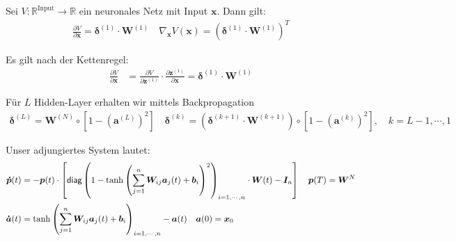 \documentclass[a4paper, 12pt]{scrartcl}
\begin{document}
\begin{satz}
    Sei $V:\mathbb{R}^{\text{Input}} \to \mathbb{R}$ ein neuronales Netz mit Input $\bm{x}$. 
    Dann gilt:
    \begin{align*}
        \frac{\partial V}{\partial \bm{x}} = \bm{\delta}^{(1)} \cdot \bm{W}^{(1)}
        \quad
        \nabla_{\bm{x}} V(\bm{x}) 
        =
        \left(\bm{\delta}^{(1)} \cdot \bm{W}^{(1)}\right)^T 
    \end{align*}
\end{satz}

\begin{beweis}
    Es gilt nach der Kettenregel:
    \begin{align*}
        \frac{\partial V}{\partial \bm{x}}
        &=
        \frac{\partial V}{\partial \bm{z}^{(1)}}
        \cdot
        \frac{\partial \bm{z}^{(1)}}{\partial \bm{x}}
        = 
        \bm{\delta}^{(1)} \cdot \bm{W}^{(1)}
    \end{align*}

    Für $L$ Hidden-Layer erhalten wir mittels Backpropagation
    \begin{align*}
        \bm{\delta}^{(L)} = \bm{W}^{(N)} \circ \left[1 - \left(\bm{a}^{(L)}\right)^2 \right]
        \quad
        \bm{\delta}^{(k)} 
        = 
        \left(
            \bm{\delta}^{(k+1)} \cdot \bm{W}^{(k+1)}
        \right) 
        \circ  
        \left[
            1 - \left(\bm{a}^{(k)}\right)^2 
        \right],
        \quad
        k=L-1, \cdots , 1
    \end{align*}
\end{beweis}

Unser adjungiertes System lautet:
\begin{align*}
    \bm{\dot{p}}(t) 
    &=
    - \bm{p}(t) \cdot 
    \left[
        \textsf{diag}
        \left(
            \vphantom{\int}
            1 - 
            \tanh
            \left(
                \sum_{j=1}^{n}
                \bm{W}_{ij} \bm{a}_j(t) + \bm{b}_{i}
            \right)^2
        \right)_{i=1,\cdots , n}
        \cdot
        \bm{W}(t)
        - \bm{I}_n
    \right]
    \quad
    \bm{p}(T) = 
    \bm{W}^N
    \\
    \bm{\dot{a}}(t)
    &=
    \tanh
        \left(
            \sum_{j=1}^{n}
            \bm{W}_{ij} \bm{a}_j(t) + \bm{b}_{i}
        \right)_{i=1,\cdots , n}
    - \bm{a}(t)
    \quad
    \bm{a}(0) = \bm{x}_0
\end{align*}
\end{document}
